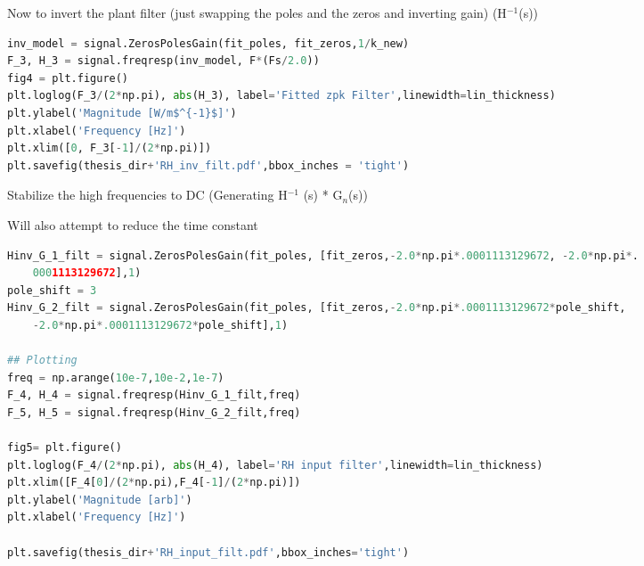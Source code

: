 \noindent Now to invert the plant filter (just swapping the poles and the zeros and inverting gain)
(H\(^{-1}\)(s))

\begin{spacing}{1.2} \begin{lstlisting}[frame=single,language=Python]
inv_model = signal.ZerosPolesGain(fit_poles, fit_zeros,1/k_new)
F_3, H_3 = signal.freqresp(inv_model, F*(Fs/2.0))
fig4 = plt.figure()
plt.loglog(F_3/(2*np.pi), abs(H_3), label='Fitted zpk Filter',linewidth=lin_thickness)
plt.ylabel('Magnitude [W/m$^{-1}$]')
plt.xlabel('Frequency [Hz]')
plt.xlim([0, F_3[-1]/(2*np.pi)])
plt.savefig(thesis_dir+'RH_inv_filt.pdf',bbox_inches = 'tight')
\end{lstlisting} \end{spacing}


\noindent Stabilize the high frequencies to DC (Generating H\(^{-1}\) (s) * G\(_{n}\)(s))

\noindent Will also attempt to reduce the time constant

\begin{spacing}{1.2} \begin{lstlisting}[frame=single,language=Python]
Hinv_G_1_filt = signal.ZerosPolesGain(fit_poles, [fit_zeros,-2.0*np.pi*.0001113129672, -2.0*np.pi*.
    0001113129672],1)
pole_shift = 3
Hinv_G_2_filt = signal.ZerosPolesGain(fit_poles, [fit_zeros,-2.0*np.pi*.0001113129672*pole_shift, 
    -2.0*np.pi*.0001113129672*pole_shift],1)

## Plotting
freq = np.arange(10e-7,10e-2,1e-7)
F_4, H_4 = signal.freqresp(Hinv_G_1_filt,freq)
F_5, H_5 = signal.freqresp(Hinv_G_2_filt,freq)

fig5= plt.figure()
plt.loglog(F_4/(2*np.pi), abs(H_4), label='RH input filter',linewidth=lin_thickness)
plt.xlim([F_4[0]/(2*np.pi),F_4[-1]/(2*np.pi)])
plt.ylabel('Magnitude [arb]')
plt.xlabel('Frequency [Hz]')

plt.savefig(thesis_dir+'RH_input_filt.pdf',bbox_inches='tight')
\end{lstlisting} \end{spacing}


